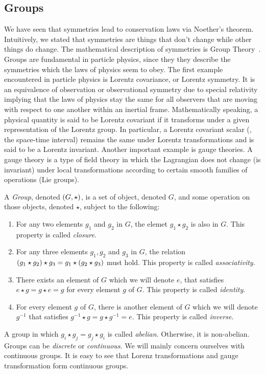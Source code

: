 \clearpage
\subsection{Groups}

We have seen that symmetries lead to conservation laws via Noether's theorem. Intuitively, we stated that symmetries are things that don't change while other things do change. The mathematical description of symmetries is Group Theory~\cite{Robinson2011-dv}. Groups are fundamental in particle physics, since they they describe the symmetries which the laws of physics seem to obey. The first example encountered in particle physics is Lorentz covariance, or Lorentz symmetry. It is an equivalence of observation or observational symmetry due to special relativity implying that the laws of physics stay the same for all observers that are moving with respect to one another within an inertial frame. Mathematically speaking, a physical quantity is said to be Lorentz covariant if it transforms under a given representation of the Lorentz group. In particular, a Lorentz covariant scalar (\ie, the space-time interval) remains the same under Lorentz transformations and is said to be a Lorentz invariant. Another important example is gauge theories. A gauge theory is a type of field theory in which the Lagrangian does not change (is invariant) under local transformations according to certain smooth families of operations (Lie groups).

A \emph{Group}, denoted $\qty(G, \star)$, is a set of object, denoted $G$, and some operation on those objects, denoted $\star$, subject to the following:
\begin{enumerate}
\item For any two elements $g_1$ and $g_2$ in $G$, the elemet $g_1\star g_2$ is also in $G$. This property is called \emph{closure}.
\item For any three elements $g_1, g_2$ and $g_3$ in $G$, the relation $\qty(g_1\star g_2)\star g_3=g_1\star\qty(g_2\star g_3)$ must hold. This property is called \emph{associativity}.
\item There exists an element of $G$ which we will denote $e$, that satisfies $e\star g = g\star e = g$ for every element $g$ of $G$. This property is called \emph{identity}.
\item For every element $g$ of $G$, there is another element of $G$ which we will denote $g^{-1}$ that satisfies $g^{-1}\star g = g\star g^{-1}=e$. This property is called \emph{inverse}.
\end{enumerate}
A group in which $g_i\star g_j=g_j\star g_i$ is called \emph{abelian}. Otherwise, it is non-abelian. Groups can be \emph{discrete} or \emph{continuous}. We will mainly concern ourselves with continuous groups. It is easy to see that Lorenz transformations and gauge transformation form continuous groups.

